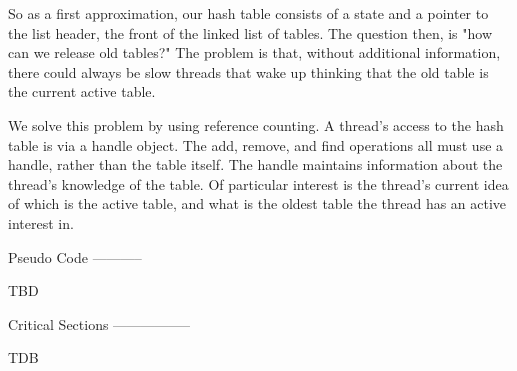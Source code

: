 So as a first approximation, our hash table consists of a state and a
pointer to the list header, the front of the linked list of tables.
The question then, is "how can we release old tables?" The problem is
that, without additional information, there could always be slow
threads that wake up thinking that the old table is the current active
table.

We solve this problem by using reference counting. A thread's access
to the hash table is via a handle object. The add, remove, and find
operations all must use a handle, rather than the table itself.  The
handle maintains information about the thread's knowledge of the
table. Of particular interest is the thread's current idea of which
is the active table, and what is the oldest table the thread has
an active interest in.



Pseudo Code
-----------

TBD


Critical Sections
-----------------

TDB
